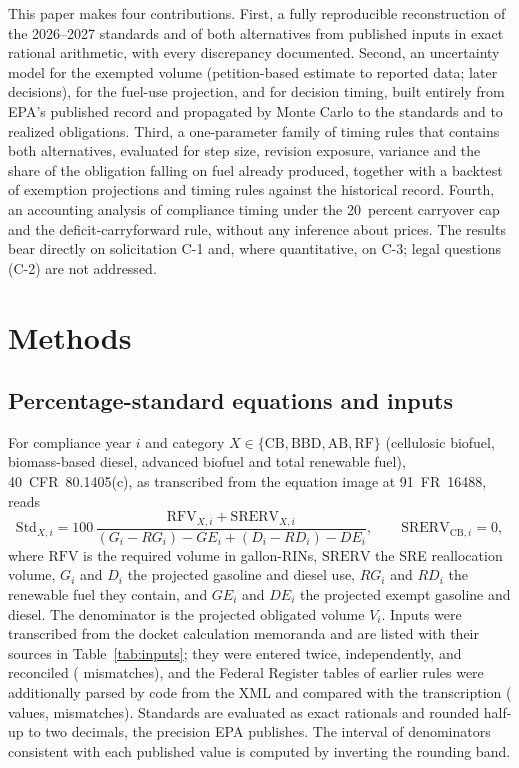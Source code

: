 \documentclass[preprint,12pt,authoryear]{elsarticle}
\begin{document}
This paper makes four contributions. First, a fully reproducible reconstruction of the 2026--2027 standards and of both alternatives from published inputs in exact rational arithmetic, with every discrepancy documented. Second, an uncertainty model for the exempted volume (petition-based estimate to reported data; later decisions), for the fuel-use projection, and for decision timing, built entirely from EPA's published record and propagated by Monte Carlo to the standards and to realized obligations. Third, a one-parameter family of timing rules that contains both alternatives, evaluated for step size, revision exposure, variance and the share of the obligation falling on fuel already produced, together with a backtest of exemption projections and timing rules against the historical record. Fourth, an accounting analysis of compliance timing under the 20~percent carryover cap and the deficit-carryforward rule, without any inference about prices. The results bear directly on solicitation C-1 and, where quantitative, on C-3; legal questions (C-2) are not addressed.

\section{Methods}

\subsection{Percentage-standard equations and inputs}

For compliance year $i$ and category $X \in \{\mathrm{CB},\mathrm{BBD},\mathrm{AB},\mathrm{RF}\}$ (cellulosic biofuel, biomass-based diesel, advanced biofuel and total renewable fuel), 40~CFR~80.1405(c), as transcribed from the equation image at 91~FR~16488, reads
\begin{equation}
\mathrm{Std}_{X,i} = 100\,\frac{\mathrm{RFV}_{X,i} + \mathrm{SRERV}_{X,i}}{(G_i - RG_i) - GE_i + (D_i - RD_i) - DE_i},
\qquad \mathrm{SRERV}_{\mathrm{CB},i} = 0,
\label{eq:std}
\end{equation}
where $\mathrm{RFV}$ is the required volume in gallon-RINs, $\mathrm{SRERV}$ the SRE reallocation volume, $G_i$ and $D_i$ the projected gasoline and diesel use, $RG_i$ and $RD_i$ the renewable fuel they contain, and $GE_i$ and $DE_i$ the projected exempt gasoline and diesel. The denominator is the projected obligated volume $V_i$. Inputs were transcribed from the docket calculation memoranda \citep{docket_0789,docket_0790,docket_0956} and are listed with their sources in Table~\ref{tab:inputs}; they were entered twice, independently, and reconciled (\valnDoubleEntryMismatches{} mismatches), and the Federal Register tables of earlier rules were additionally parsed by code from the XML and compared with the transcription (\valnFrParsedValuesCompared{} values, \valnFrParsedValuesMismatched{} mismatches). Standards are evaluated as exact rationals and rounded half-up to two decimals, the precision EPA publishes. The interval of denominators consistent with each published value is computed by inverting the rounding band.
\end{document}
